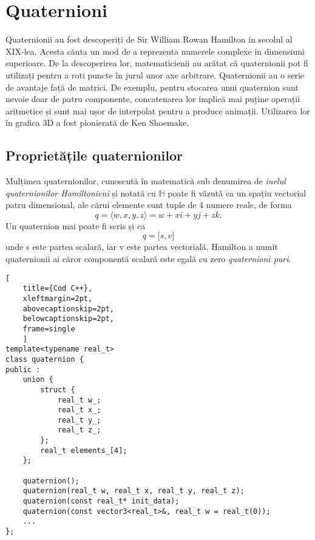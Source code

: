 \section{Quaternioni}
\label{ch1:quaternions}
\indent

Quaternionii au fost descoperiți de Sir William Rowan Hamilton in secolul al
XIX-lea. Acesta căuta un mod de a reprezenta numerele complexe in dimensiuni
superioare. De la descoperirea lor, matematicienii au arătat că quaternionii pot
fi utilizați pentru a roti puncte în jurul unor axe arbitrare.
Quaternionii au o serie de avantaje față de matrici. De exemplu, pentru
stocarea unui quaternion sunt nevoie doar de patru componente, concatenarea lor
implică mai puține operații aritmetice și sunt mai ușor de interpolat pentru a
produce animații. Utilizarea lor în grafica 3D a fost pionierată de
Ken Shoemake.

\subsection{Proprietățile quaternionilor}
\label{ch1:quaternions:properties}
\indent

Mulțimea quaternionilor, cunoscută în matematică sub denumirea de \textit{inelul
quaternionilor Hamiltonieni} și notată cu $\mathbb{H}$ poate fi văzută ca
un spațiu vectorial patru dimensional, ale cărui elemente sunt tuple de 4
numere reale, de forma 
\begin{equation}
q = \langle w, x, y, z\rangle = w + x\mathit{i} + y\mathit{j} + z\mathit{k}.
\end{equation}
Un quaternion mai poate fi scris și ca 
\begin{equation}
q = \lbrack s, v \rbrack
\end{equation} unde s este partea scalară, iar v este partea vectorială.
Hamilton a numit quaternionii ai căror componentă scalară este egală cu zero
\textit{quaternioni puri}.
\begin{lstlisting}[
    title={Cod C++}, 
    xleftmargin=2pt,
    abovecaptionskip=2pt,
    belowcaptionskip=2pt,
    frame=single
    ]
template<typename real_t>
class quaternion {
public :
    union {
        struct {
            real_t w_;
            real_t x_;
            real_t y_;
            real_t z_;
        };
        real_t elements_[4];
    };

    quaternion();
    quaternion(real_t w, real_t x, real_t y, real_t z);
    quaternion(const real_t* init_data);
    quaternion(const vector3<real_t>&, real_t w = real_t(0));
    ...
};
\end{lstlisting}

